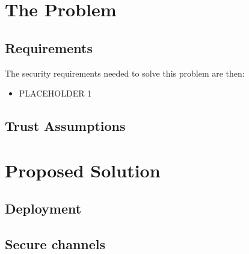 \documentclass[a4paper]{article}
\begin{document}
\tableofcontents

\pagebreak

\section{The Problem}

\subsection{Requirements}

The security requirements needed to solve this problem are then:
\begin{itemize}
    \item PLACEHOLDER 1
\end{itemize}

\subsection{Trust Assumptions}

\section{Proposed Solution}

\subsection{Deployment}

\subsection{Secure channels}

\end{document}

